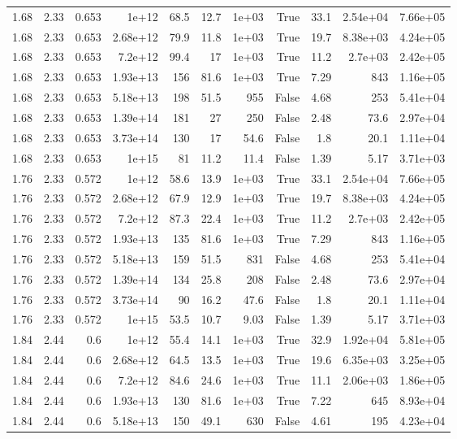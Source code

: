 \begin{table}
\begin{tabular}{rrrrrrrrrrr}
1.68 & 2.33 & 0.653 & 1e+12 & 68.5 & 12.7 & 1e+03 & True & 33.1 & 2.54e+04 & 7.66e+05 \\
1.68 & 2.33 & 0.653 & 2.68e+12 & 79.9 & 11.8 & 1e+03 & True & 19.7 & 8.38e+03 & 4.24e+05 \\
1.68 & 2.33 & 0.653 & 7.2e+12 & 99.4 & 17 & 1e+03 & True & 11.2 & 2.7e+03 & 2.42e+05 \\
1.68 & 2.33 & 0.653 & 1.93e+13 & 156 & 81.6 & 1e+03 & True & 7.29 & 843 & 1.16e+05 \\
1.68 & 2.33 & 0.653 & 5.18e+13 & 198 & 51.5 & 955 & False & 4.68 & 253 & 5.41e+04 \\
1.68 & 2.33 & 0.653 & 1.39e+14 & 181 & 27 & 250 & False & 2.48 & 73.6 & 2.97e+04 \\
1.68 & 2.33 & 0.653 & 3.73e+14 & 130 & 17 & 54.6 & False & 1.8 & 20.1 & 1.11e+04 \\
1.68 & 2.33 & 0.653 & 1e+15 & 81 & 11.2 & 11.4 & False & 1.39 & 5.17 & 3.71e+03 \\
1.76 & 2.33 & 0.572 & 1e+12 & 58.6 & 13.9 & 1e+03 & True & 33.1 & 2.54e+04 & 7.66e+05 \\
1.76 & 2.33 & 0.572 & 2.68e+12 & 67.9 & 12.9 & 1e+03 & True & 19.7 & 8.38e+03 & 4.24e+05 \\
1.76 & 2.33 & 0.572 & 7.2e+12 & 87.3 & 22.4 & 1e+03 & True & 11.2 & 2.7e+03 & 2.42e+05 \\
1.76 & 2.33 & 0.572 & 1.93e+13 & 135 & 81.6 & 1e+03 & True & 7.29 & 843 & 1.16e+05 \\
1.76 & 2.33 & 0.572 & 5.18e+13 & 159 & 51.5 & 831 & False & 4.68 & 253 & 5.41e+04 \\
1.76 & 2.33 & 0.572 & 1.39e+14 & 134 & 25.8 & 208 & False & 2.48 & 73.6 & 2.97e+04 \\
1.76 & 2.33 & 0.572 & 3.73e+14 & 90 & 16.2 & 47.6 & False & 1.8 & 20.1 & 1.11e+04 \\
1.76 & 2.33 & 0.572 & 1e+15 & 53.5 & 10.7 & 9.03 & False & 1.39 & 5.17 & 3.71e+03 \\
1.84 & 2.44 & 0.6 & 1e+12 & 55.4 & 14.1 & 1e+03 & True & 32.9 & 1.92e+04 & 5.81e+05 \\
1.84 & 2.44 & 0.6 & 2.68e+12 & 64.5 & 13.5 & 1e+03 & True & 19.6 & 6.35e+03 & 3.25e+05 \\
1.84 & 2.44 & 0.6 & 7.2e+12 & 84.6 & 24.6 & 1e+03 & True & 11.1 & 2.06e+03 & 1.86e+05 \\
1.84 & 2.44 & 0.6 & 1.93e+13 & 130 & 81.6 & 1e+03 & True & 7.22 & 645 & 8.93e+04 \\
1.84 & 2.44 & 0.6 & 5.18e+13 & 150 & 49.1 & 630 & False & 4.61 & 195 & 4.23e+04 \\

\end{tabular}
\end{table}
